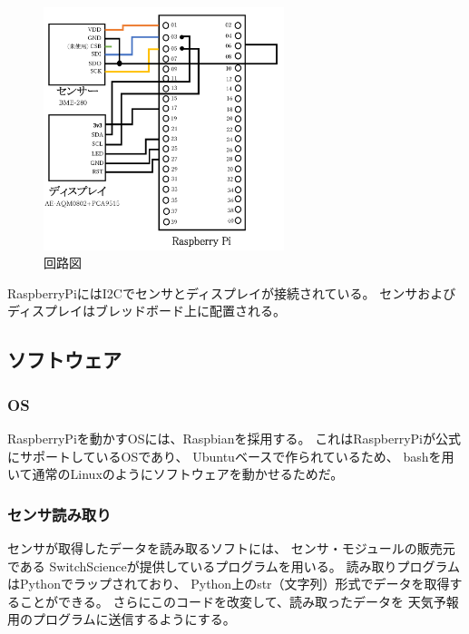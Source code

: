 \documentclass{jsarticle}
\begin{document}
        \begin{figure}[htbp]
          \begin{center}
            \includegraphics[clip,width=7.0cm]{img/circuit}
            \caption{回路図}
            \label{fig:circuit}
          \end{center}
        \end{figure}
        
        RaspberryPiにはI2Cでセンサとディスプレイが接続されている。
        センサおよびディスプレイはブレッドボード上に配置される。
        
    
      \subsection{ソフトウェア}
      
        \subsubsection{OS}
        
          RaspberryPiを動かすOSには、Raspbianを採用する。
          これはRaspberryPiが公式にサポートしているOSであり、
          Ubuntuベースで作られているため、
          bashを用いて通常のLinuxのようにソフトウェアを動かせるためだ。
          
        \subsubsection{センサ読み取り}
        
          センサが取得したデータを読み取るソフトには、
          センサ・モジュールの販売元である
          SwitchScienceが提供しているプログラムを用いる。
          読み取りプログラムはPythonでラップされており、
          Python上のstr（文字列）形式でデータを取得することができる。
          さらにこのコードを改変して、読み取ったデータを
          天気予報用のプログラムに送信するようにする。
          
\end{document}
